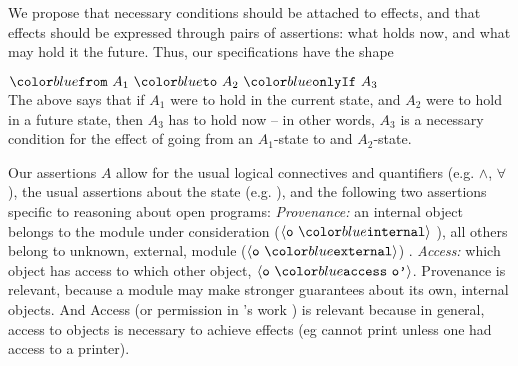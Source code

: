 We propose that necessary conditions should be attached to effects, and that 
 effects should be expressed through pairs of assertions: what holds now, and what may hold it the future. Thus, our 
 specifications have the shape\\
\strut \hspace{1.5in} $\onlyIf {A_1} {A_2} {A_3}$ \\
\noindent
The above says that if $A_1$ were to hold in the current state, and $A_2$ were to hold in a future state,
then $A_3$ has to hold now -- in other words, $A_3$ is a necessary condition for  the effect of going
from an $A_1$-state to and $A_2$-state.

Our assertions $A$ allow for the usual logical connectives and quantifiers
 (e.g. $\wedge$, $\forall$), the usual assertions about the state (e.g. ), and 
 the following two assertions specific to reasoning about open programs:
 \emph{Provenance:}
 an internal object belongs to the module under consideration ($\internal{\texttt{o}}$ ), all others
 belong to   unknown, external, module ($\external{\texttt{o}}$) .  \emph{Access:} 
 which object has access to which other object, $\access{\texttt{o}}{\texttt{o'}}$. 
 Provenance is relevant, because a
 module may make stronger guarantees about its own, internal objects. 
 And Access (or permission in \cite{miller-esop2013}'s work ) is relevant because in general,
 access to objects is necessary to
 achieve effects (eg cannot print unless one had access to a printer).
  
 
 

